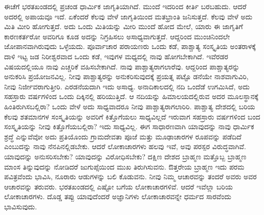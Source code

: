 ಈಚೆಗೆ ಭರತಖಂಡದಲ್ಲಿ ಪ್ರಚಂಡ ಧಾರ್ಮಿಕ ಜಾಗೃತಿಯಾಗಿದೆ. ಮುಂದೆ ಇದರಿಂದ ಕೀರ್ತಿ ಬರಬಹುದು. ಆದರೆ ಅದರಲ್ಲಿ ಅಪಾಯವೂ ಇದೆ. ಏಕೆಂದರೆ ಕೆಲವು ವೇಳೆ ಜಾಗೃತಿಯಿಂದ ಮತಭ್ರಾಂತಿ ಜನಿಸುತ್ತದೆ. ಕೆಲವು ವೇಳೆ ಅದು ಮಿತಿ ಮೀರಿ ಹೋಗುತ್ತದೆ. ಅದು ಒಂದು ಮಿತಿಯನ್ನು ಮೀರಿ ಮುಂದೆ ಹೋದ ಮೇಲೆ, ಯಾರು ಈ ಜಾಗೃತಿಗೆ ಕಾರಣಕರ್ತರೋ ಅವರಿಗೂ ಕೂಡ ಅದನ್ನು ನಿಗ್ರಹಿಸಲು ಅಸಾಧ್ಯವಾಗುತ್ತದೆ. ಆದ್ದರಿಂದ ಮುಂಚಿನಿಂದಲೇ ಜೋಪಾನವಾಗಿರುವುದು ಒಳ್ಳೆಯದು. ಪೂರ್ವಾಚಾರ ಪರಾಯಣರು ಒಂದು ಕಡೆ, ಪಾಶ್ಚಾತ್ಯ ಸಂಸ್ಕೃತಿಯ ಅಂತರಾಳಕ್ಕೆ ದಾಳಿ ಇಟ್ಟ ಜಡ ನಿರೀಶ್ವರವಾದ ಒಂದು ಕಡೆ, ಇವುಗಳ ಮಧ್ಯದಲ್ಲಿ ನಾವು ಹೋಗಬೇಕಾಗಿದೆ. ಇವೆರಡರ ವಿಷಯದಲ್ಲಿಯೂ ನಾವು ಎಚ್ಚರಿಕೆ ವಹಿಸಬೇಕಾಗಿದೆ. ನಾವು ಪಾಶ್ಚಾತ್ಯರಾಗಲಾರೆವು. ಆದ್ದರಿಂದ ಪಾಶ್ಚಾತ್ಯರನ್ನು ಅನುಕರಿಸಿ ಪ್ರಯೋಜನವಿಲ್ಲ. ನೀವು ಪಾಶ್ಚಾತ್ಯರನ್ನು ಅನುಕರಿಸುವುದಕ್ಕೆ ಪ್ರಯತ್ನ ಪಟ್ಟೊ ಡನೆಯೇ ನಾಶವಾಗುವಿರಿ, ನೀವು ನಿರ್ಜೀವರಾಗುತ್ತೀರಿ. ಎರಡನೆಯದಾಗಿ ಇದು ಅಸಾಧ್ಯ. ಅನಾದಿಕಾಲದಲ್ಲಿ ನದಿ ಒಂದೆಡೆ ಉಗಮಿಸಿದೆ, ಅದು ಸಹಸ್ರಾರು ವರ್ಷಗಳಿಂದ ಒಂದು ದಿಕ್ಕಿನಲ್ಲಿ ಹರಿಯುತ್ತಿದೆ. ಆ ನದಿಯನ್ನು ಹಿಮಾಲಯದಲ್ಲಿರುವ ಅದರ ಮೂಲಸ್ಥಾನಕ್ಕೆ ಹಿಂತಿರುಗಿಸಬಲ್ಲಿರಾ? ಒಂದು ವೇಳೆ ಅದು ಸಾಧ್ಯವಾದರೂ ನೀವು ಪಾಶ್ಚಾತ್ಯರಾಗಲಾರಿರಿ. ಪಾಶ್ಚಾತ್ಯ ದೇಶದಲ್ಲಿ ಬರಿಯ ಕೆಲವು ಶತಮಾನಗಳ ಸಂಸ್ಕೃತಿಯನ್ನು ಅವರಿಗೆ ಕಿತ್ತೊಗೆಯಲು ಸಾಧ್ಯವಿಲ್ಲದೆ ಇರುವಾಗ ಸಹಸ್ರಾರು ವರ್ಷಗಳಿಂದ ಬಂದ ಸಂಸ್ಕೃತಿಯನ್ನು ನೀವು ಕಿತ್ತೊಗೆಯಬಲ್ಲಿರಾ? ಇದು ಸಾಧ್ಯವಿಲ್ಲ. ಈಗ ಸಾಧಾರಣವಾಗಿ ಯಾವುದನ್ನು ನಾವು ಧಾರ್ಮಿಕ ಶ್ರದ್ಧೆ ಎನ್ನುವೆವೋ ಅದು ಪ್ರತಿಯೊಂದು ಗ್ರಾಮದೇವತಾ ಪೂಜೆ ಮತ್ತು ಮೂಢಾಚಾರಗಳ ರೂಪವನ್ನು ಪಡೆದಿದೆ ಎಂಬುದನ್ನು ನಾವು ನೆನಪಿನಲ್ಲಿಡಬೇಕು. ಆದರೆ ಲೋಕಾಚಾರಗಳು ಹಲವು ಇವೆ, ಅವು ಪರಸ್ಪರ ವಿರುದ್ಧವಾಗಿವೆ. ಯಾವುದನ್ನು ಅನುಸರಿಸಬೇಕು? ಯಾವುದನ್ನು ವಿರೋಧಿಸಬೇಕು? ದಕ್ಷಿಣ ದೇಶದ ಬ್ರಾಹ್ಮಣ ಮತ್ತೊಬ್ಬ ಬ್ರಾಹ್ಮಣ ಮಾಂಸ ತಿನ್ನುವುದನ್ನು ನೋಡಿದರೆ ಜುಗುಪ್ಸೆಯಿಂದ ಮುಖ ತಿರುಗಿಸುವನು. ಔತ್ತರೇಯ ಬ್ರಾಹ್ಮಣ ಇದು ಪರಮ ಪವಿತ್ರವೆಂದು ಭಾವಿಸಿ, ನೂರಾರು ಆಡುಗಳನ್ನು ಬಲಿ ಕೊಡುವನು. ನೀವು ನಿಮ್ಮ ಆಚಾರವನ್ನು ತಂದರೆ ಅವರು ಅವರ ಆಚಾರವನ್ನು ತರುವರು. ಭರತಖಂಡದಲ್ಲಿ ಎಷ್ಟೋ ಬಗೆಯ ಲೋಕಾಚಾರಗಳಿವೆ. ಆದರೆ ಇವೆಲ್ಲಾ ಬರಿಯ ಲೋಕಾಚಾರಗಳು. ದೊಡ್ಡ ತಪ್ಪು ಯಾವುದೆಂದರೆ ಅಜ್ಞಾನಿಗಳು ಲೋಕಾಚಾರವನ್ನೇ ಧರ್ಮದ ಸಾರವೆಂದು ಭಾವಿಸುವುದು.

